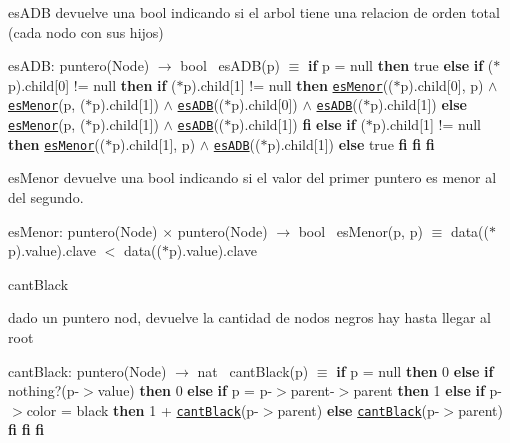 \begin{DoxyParagraph}{es\+A\+DB}
devuelve una bool indicando si el arbol tiene una relacion de orden total (cada nodo con sus hijos)

es\+A\+DB\+: puntero(\+Node) $\to$ bool~\newline
 es\+A\+D\+B(p) $\equiv$ {\bfseries if} p = null {\bfseries then} true {\bfseries else} {\bfseries if} ($\ast$p).child\mbox{[}0\mbox{]} != null {\bfseries then} {\bfseries if} ($\ast$p).child\mbox{[}1\mbox{]} != null {\bfseries then} \href{axiomas.html#esMenor}{\tt es\+Menor}(($\ast$p).child\mbox{[}0\mbox{]}, p) $\land$ \href{axiomas.html#esMenor}{\tt es\+Menor}(p, ($\ast$p).child\mbox{[}1\mbox{]}) $\land$ \href{axiomas.html#esADB}{\tt es\+A\+DB}(($\ast$p).child\mbox{[}0\mbox{]}) $\land$ \href{axiomas.html#esADB}{\tt es\+A\+DB}(($\ast$p).child\mbox{[}1\mbox{]}) {\bfseries else} \href{axiomas.html#esMenor}{\tt es\+Menor}(p, ($\ast$p).child\mbox{[}1\mbox{]}) $\land$ \href{axiomas.html#esADB}{\tt es\+A\+DB}(($\ast$p).child\mbox{[}1\mbox{]}) {\bfseries fi} {\bfseries else} {\bfseries if} ($\ast$p).child\mbox{[}1\mbox{]} != null {\bfseries then} \href{axiomas.html#esMenor}{\tt es\+Menor}(($\ast$p).child\mbox{[}1\mbox{]}, p) $\land$ \href{axiomas.html#esADB}{\tt es\+A\+DB}(($\ast$p).child\mbox{[}1\mbox{]}) {\bfseries else} true {\bfseries fi} {\bfseries fi} {\bfseries fi} 
\end{DoxyParagraph}


\begin{DoxyParagraph}{es\+Menor}
devuelve una bool indicando si el valor del primer puntero es menor al del segundo.

es\+Menor\+: puntero(\+Node) $\times$ puntero(\+Node) $\to$ bool~\newline
 es\+Menor(p, p\textquotesingle{}) $\equiv$ data(($\ast$p).value).clave $<$ data(($\ast$p).value).clave 
\end{DoxyParagraph}


\begin{DoxyParagraph}{cant\+Black}

\end{DoxyParagraph}
dado un puntero nod, devuelve la cantidad de nodos negros hay hasta llegar al root

cant\+Black\+: puntero(\+Node) $\to$ nat~\newline
 cant\+Black(p) $\equiv$ {\bfseries if} p = null {\bfseries then} 0 {\bfseries else} {\bfseries if} nothing?(p-\/$>$value) {\bfseries then} 0 {\bfseries else} {\bfseries if} p = p-\/$>$parent-\/$>$parent {\bfseries then} 1 {\bfseries else} {\bfseries if} p-\/$>$color = black {\bfseries then} 1 + \href{axiomas.html#cantBlack}{\tt cant\+Black}(p-\/$>$parent) {\bfseries else} \href{axiomas.html#cantBlack}{\tt cant\+Black}(p-\/$>$parent) {\bfseries fi} {\bfseries fi} {\bfseries fi} 

